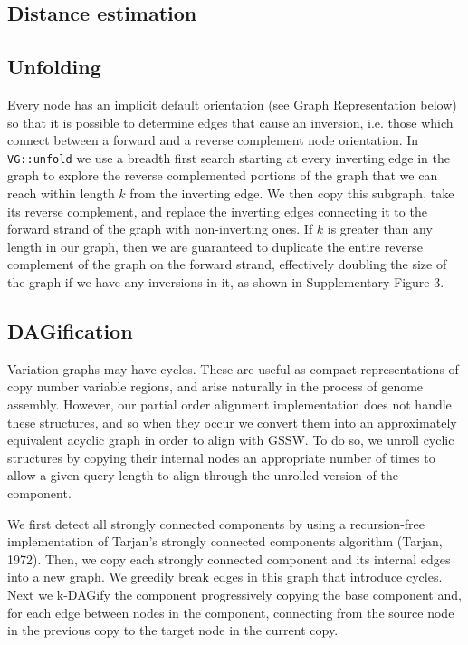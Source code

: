 \subsection{Distance estimation}

\subsection{Unfolding}

Every node has an implicit default orientation (see Graph Representation below) so that it is possible to determine edges that cause an inversion, i.e. those which connect between a forward and a reverse complement node orientation. 
In {\tt VG::unfold} we use a breadth first search starting at every inverting edge in the graph to explore the reverse complemented portions of the graph that we can reach within length $k$ from the inverting edge.
We then copy this subgraph, take its reverse complement, and replace the inverting edges connecting it to the forward strand of the graph with non-inverting ones.
If $k$ is greater than any length in our graph, then we are guaranteed to  duplicate the entire reverse complement of the graph on the forward strand, effectively doubling the size of the graph if we have any inversions in it, as shown in Supplementary Figure 3. %

\subsection{DAGification}

Variation graphs may have cycles.
These are useful as compact representations of copy number variable regions, and arise naturally in the process of genome assembly.
However, our partial order alignment implementation does not handle these structures, and so when they occur we convert them into an approximately equivalent acyclic graph in order to align with GSSW.
To do so, we unroll cyclic structures by copying their internal nodes an appropriate number of times to allow a given query length to align through the unrolled version of the component.

We first detect all strongly connected components by using a recursion-free implementation of Tarjan's strongly connected components algorithm (Tarjan, 1972).
Then, we copy each strongly connected component and its internal edges into a new graph.
We greedily break edges in this graph that introduce cycles.
Next we k-DAGify the component progressively copying the base component and, for each edge between nodes in the component, connecting from the source node in the previous copy to the target node in the current copy.

